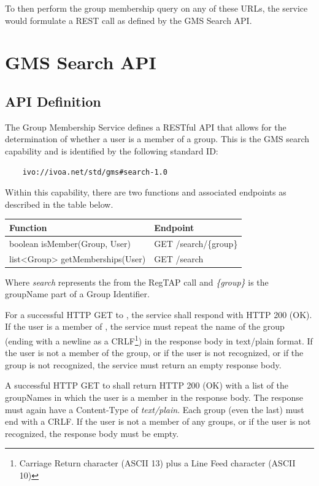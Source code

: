 \documentclass[11pt,a4paper]{ivoa}
\begin{document}
To then perform the group membership query on any of these URLs, the service would formulate a REST call as defined by the GMS Search API.

\section{GMS Search API}

\subsection{API Definition}
\label{subsec:api}

The Group Membership Service defines a RESTful API \citep{fielding00} that allows for the determination of whether a user is a member of a group.  This is the GMS search capability and is identified by the following standard ID:

\begin{verbatim}
    ivo://ivoa.net/std/gms#search-1.0
\end{verbatim}

Within this capability, there are two functions and associated endpoints as described in the table below.

\vspace{3mm}
\begin{tabular}{l l}
\textbf{Function} & \textbf{Endpoint} \\
\hline
boolean isMember(Group, User) & GET /search/\{group\} \\
list<Group> getMemberships(User) & GET /search \\
\hline
\end{tabular}
\vspace{3mm}

Where \emph{search} represents the  from the RegTAP call and \emph{\{group\}} is the groupName part of a Group Identifier.

For a successful HTTP GET to , the service shall respond with HTTP 200 (OK).  If the user is a member of , the service must repeat the name of the group (ending with a newline as a CRLF\footnote{Carriage Return character (ASCII 13) plus a Line Feed character (ASCII 10)}) in the response body in text/plain format.  If the user is not a member of the group, or if the user is not recognized, or if the group is not recognized, the service must return an empty response body.

A successful HTTP GET to  shall return HTTP 200 (OK) with a list of the groupNames in which the user is a member in the response body.  The response must again have a Content-Type of \emph {text/plain}.  Each group (even the last) must end with a CRLF.  If the user is not a member of any groups, or if the user is not recognized, the response body must be empty.
\end{document}
